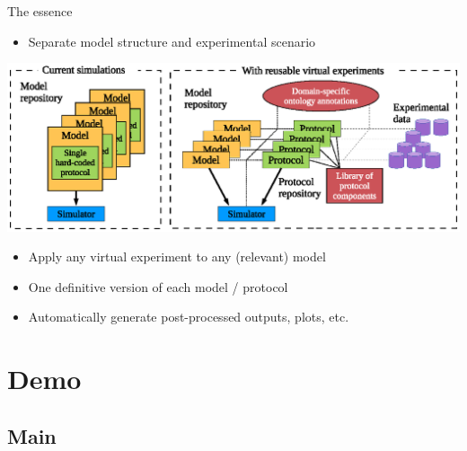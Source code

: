 \documentclass[t,xcolor={usenames,dvipsnames}]{beamer}
\newcommand{\subitem}[1]{\begin{itemize}[<.->]\item #1 \end{itemize}}
\begin{document}
\begin{frame}{The essence}
\subitem{Separate \alert{model structure} and \alert{experimental scenario}}
\vspace{-.2cm}
\hspace{-1cm}\includegraphics[width=1.185\textwidth]{virtual_expts_schematic}
\vspace{-.31cm}
\begin{itemize}
\item Apply any \alert{virtual experiment} to any (relevant) model
\item One definitive version of each model / protocol
\item Automatically generate post-processed outputs, plots, etc.
\end{itemize}
\end{frame}


\section{Demo}
\subsection*{Main}
\end{document}

